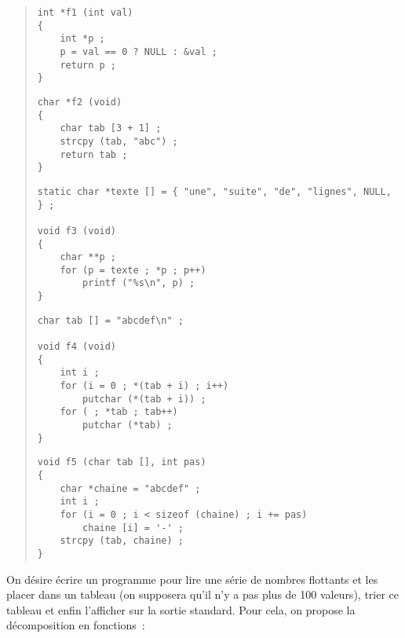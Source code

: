 \begin {quote}
    \small

\begin {verbatim}
int *f1 (int val)
{
    int *p ;
    p = val == 0 ? NULL : &val ;
    return p ;
}
\end{verbatim}

\begin {verbatim}
char *f2 (void)
{
    char tab [3 + 1] ;
    strcpy (tab, "abc") ;
    return tab ;
}
\end{verbatim}

\begin {verbatim}
static char *texte [] = { "une", "suite", "de", "lignes", NULL, } ;

void f3 (void)
{
    char **p ;
    for (p = texte ; *p ; p++)
        printf ("%
}
\end{verbatim}

\begin {verbatim}
char tab [] = "abcdef\n" ;

void f4 (void)
{
    int i ;
    for (i = 0 ; *(tab + i) ; i++)
        putchar (*(tab + i)) ;
    for ( ; *tab ; tab++)
        putchar (*tab) ;
}
\end{verbatim}


\begin {verbatim}
void f5 (char tab [], int pas)
{
    char *chaine = "abcdef" ;
    int i ;
    for (i = 0 ; i < sizeof (chaine) ; i += pas)
        chaine [i] = '-' ;
    strcpy (tab, chaine) ;
}
\end{verbatim}
\end {quote}


\question
    \label {sortfloat}

On désire écrire un programme pour lire une série de nombres flottants et
les placer dans un tableau (on supposera qu'il n'y a pas plus de 100
valeurs), trier ce tableau et enfin l'afficher sur la sortie standard.
Pour cela, on propose la décomposition en fonctions~:

